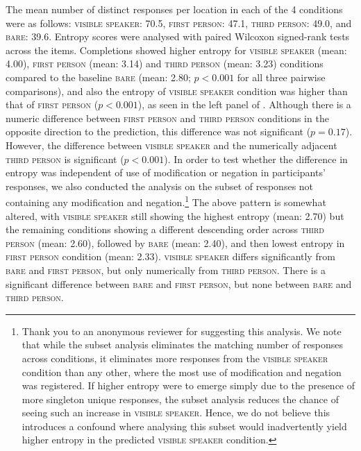 \documentclass[output=paper,colorlinks,citecolor=brown]{langscibook}
\begin{document}
The mean number of distinct responses per location in each of the 4 conditions were as follows: \textsc{visible speaker}: 70.5, \textsc{first person}: 47.1, \textsc{third person}: 49.0, and \textsc{bare}: 39.6. Entropy scores were analysed with paired Wilcoxon signed-rank tests across the items. Completions showed higher entropy for \textsc{visible speaker} (mean: 4.00), \textsc{first person} (mean: 3.14) and \textsc{third person} (mean: 3.23) conditions compared to the baseline \textsc{bare} (mean: 2.80; $p < 0.001$ for all three pairwise comparisons), and also the entropy of \textsc{visible speaker} condition was higher than that of \textsc{first person} ($p < 0.001$), as seen in the left panel of . Although there is a numeric difference between \textsc{first person} and \textsc{third person} conditions in the opposite direction to the prediction, this difference was not significant ($p = 0.17$). However, the difference between \textsc{visible speaker} and the numerically adjacent \textsc{third person} is significant ($p < 0.001$). In order to test whether the difference in entropy was independent of use of modification or negation in participants' responses, we also conducted the analysis on the subset of responses not containing any modification and negation.\footnote{Thank you to an anonymous reviewer for suggesting this analysis. We note that while the subset analysis eliminates the matching number of responses across conditions, it eliminates more responses from the \textsc{visible speaker} condition than any other, where the most use of modification and negation was registered. If higher entropy were to emerge simply due to the presence of more singleton unique responses, the subset analysis reduces the chance of seeing such an increase in \textsc{visible speaker}. Hence, we do not believe this introduces a confound where analysing this subset would inadvertently yield higher entropy in the predicted \textsc{visible speaker} condition.} The above pattern is somewhat altered, with \textsc{visible speaker} still showing the highest entropy (mean: 2.70) but the remaining conditions showing a different descending order across \textsc{third person} (mean: 2.60), followed by \textsc{bare} (mean: 2.40), and then lowest entropy in \textsc{first person} condition (mean: 2.33). \textsc{visible speaker} differs signi\-ficantly from \textsc{bare} and \textsc{first person}, but only numerically from \textsc{third person}. There is a significant difference between \textsc{bare} and \textsc{first person}, but none between \textsc{bare} and \textsc{third person}.
\end{document}
